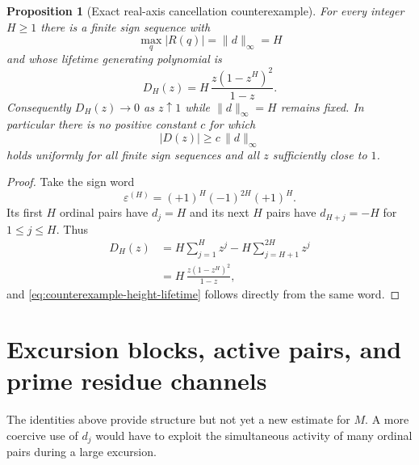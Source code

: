 \documentclass[11pt]{amsart}
\numberwithin{equation}{section}
\theoremstyle{plain}
\newtheorem{proposition}[theorem]{Proposition}
\theoremstyle{definition}
\theoremstyle{remark}
\begin{document}
\begin{proposition}[Exact real-axis cancellation counterexample]
\label{prop:D-real-axis-counterexample}
For every integer $H\ge1$ there is a finite sign sequence with
\begin{equation}
\label{eq:counterexample-height-lifetime}
\max_q|R(q)|=\lVert d\rVert_\infty=H
\end{equation}
and whose lifetime generating polynomial is
\begin{equation}
\label{eq:counterexample-D-exact}
D_H(z)=H\,\frac{z(1-z^H)^2}{1-z}.
\end{equation}
Consequently $D_H(z)\to0$ as $z\uparrow1$ while
$\lVert d\rVert_\infty=H$ remains fixed.  In particular there is no
positive constant $c$ for which
\begin{equation}
\label{eq:no-real-axis-coercive-lower}
|D(z)|\ge c\,\lVert d\rVert_\infty
\end{equation}
holds uniformly for all finite sign sequences and all $z$ sufficiently close
to $1$.
\end{proposition}

\begin{proof}
Take the sign word
\begin{equation}
\label{eq:counterexample-sign-word}
\varepsilon^{(H)}=(+1)^H(-1)^{2H}(+1)^H.
\end{equation}
Its first $H$ ordinal pairs have $d_j=H$ and its next $H$ pairs have
$d_{H+j}=-H$ for $1\le j\le H$.  Thus
\begin{align}
D_H(z)
&=H\sum_{j=1}^{H}z^j-H\sum_{j=H+1}^{2H}z^j
\label{eq:counterexample-D-sums}\\
&=H\,\frac{z(1-z^H)^2}{1-z},
\label{eq:counterexample-D-factor}
\end{align}
and \eqref{eq:counterexample-height-lifetime} follows directly from the same
word.
\end{proof}

\section{Excursion blocks, active pairs, and prime residue channels}
\label{sec:excursion-residue}

The identities above provide structure but not yet a new estimate for $M$.  A
more coercive use of $d_j$ would have to exploit the simultaneous activity of
many ordinal pairs during a large excursion.
\end{document}
